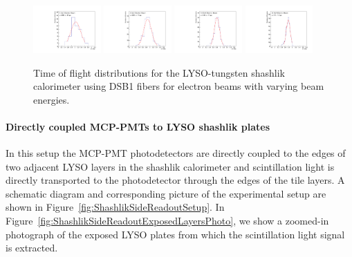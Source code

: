 \begin{figure}[ht!] \centering
\includegraphics[width=0.23\textwidth]{figs/TOF_ShashlikDSB1Fiber_Electron_4GeV} 
\includegraphics[width=0.23\textwidth]{figs/TOF_ShashlikDSB1Fiber_Electron_8GeV} 
\includegraphics[width=0.23\textwidth]{figs/TOF_ShashlikDSB1Fiber_Electron_16GeV} 
\includegraphics[width=0.23\textwidth]{figs/TOF_ShashlikDSB1Fiber_Electron_32GeV} 
\caption{\small Time of flight distributions for the LYSO-tungsten shashlik calorimeter
using DSB1 fibers for electron beams with varying beam energies.} 
\label{fig:ShashlikFiberTOF}
\end{figure}


\paragraph{Directly coupled MCP-PMTs to LYSO shashlik plates}

In this setup the MCP-PMT photodetectors are directly coupled to the edges of two adjacent LYSO layers in the shashlik
calorimeter and scintillation light is directly transported to the photodetector
through the edges of the tile layers. A schematic diagram and corresponding
picture  of the experimental setup are shown in
Figure~\ref{fig:ShashlikSideReadoutSetup}. In
Figure~\ref{fig:ShashlikSideReadoutExposedLayersPhoto}, we show a zoomed-in
photograph of the exposed LYSO plates from which the scintillation light signal
is extracted.


